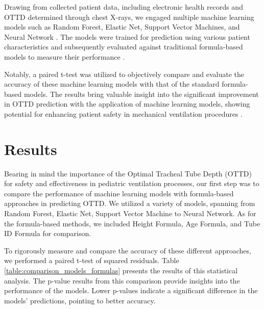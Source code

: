 \documentclass[11pt]{article}
\begin{document}
Drawing from collected patient data, including electronic health records and OTTD determined through chest X-rays, we engaged multiple machine learning models such as Random Forest, Elastic Net, Support Vector Machines, and Neural Network \cite{Kress2000DailyIO}. The models were trained for prediction using various patient characteristics and subsequently evaluated against traditional formula-based models to measure their performance \cite{Alexander2017AnOR}.

Notably, a paired t-test was utilized to objectively compare and evaluate the accuracy of these machine learning models with that of the standard formula-based models. The results bring valuable insight into the significant improvement in OTTD prediction with the application of machine learning models, showing potential for enhancing patient safety in mechanical ventilation procedures \cite{Rajajee2011RealtimeUP}.

\section*{Results}

Bearing in mind the importance of the Optimal Tracheal Tube Depth (OTTD) for safety and effectiveness in pediatric ventilation processes, our first step was to compare the performance of machine learning models with formula-based approaches in predicting OTTD. We utilized a variety of models, spanning from Random Forest, Elastic Net, Support Vector Machine to Neural Network. As for the formula-based methods, we included Height Formula, Age Formula, and Tube ID Formula for comparison.

To rigorously measure and compare the accuracy of these different approaches, we performed a paired t-test of squared residuals. Table {}\ref{table:comparison_models_formulas} presents the results of this statistical analysis. The p-value results from this comparison provide insights into the performance of the models. Lower p-values indicate a significant difference in the models' predictions, pointing to better accuracy.
\end{document}
